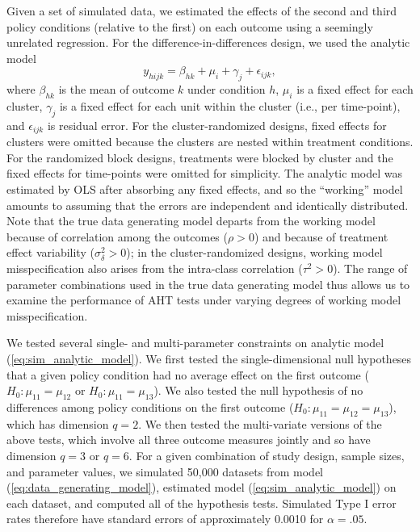 \documentclass[12pt]{article}\usepackage[]{graphicx}\usepackage[]{color}
\begin{document}
Given a set of simulated data, we estimated the effects of the second and third policy conditions (relative to the first) on each outcome using a seemingly unrelated regression. 
For the difference-in-differences design, we used the analytic model
\begin{equation}
\label{eq:sim_analytic_model}
y_{hijk} = \beta_{hk} + \mu_i + \gamma_j + \epsilon_{ijk},
\end{equation}
where $\beta_{hk}$ is the mean of outcome $k$ under condition $h$, $\mu_i$ is a fixed effect for each cluster, $\gamma_j$ is a fixed effect for each unit within the cluster (i.e., per time-point), and $\epsilon_{ijk}$ is residual error. 
For the cluster-randomized designs, fixed effects for clusters were omitted because the clusters are nested within treatment conditions. 
For the randomized block designs, treatments were blocked by cluster and the fixed effects for time-points were omitted for simplicity.
The analytic model was estimated by OLS after absorbing any fixed effects, and so the ``working'' model amounts to assuming that the errors are independent and identically distributed. 
Note that the true data generating model departs from the working model because of correlation among the outcomes ($\rho > 0$) and because of treatment effect variability ($\sigma_\delta^2 > 0$); in the cluster-randomized designs, working model misspecification also arises from the intra-class correlation ($\tau^2 > 0$). 
The range of parameter combinations used in the true data generating model thus allows us to examine the performance of AHT tests under varying degrees of working model misspecification.



We tested several single- and multi-parameter constraints on analytic model (\ref{eq:sim_analytic_model}). 
We first tested the single-dimensional null hypotheses that a given policy condition had no average effect on the first outcome ($H_0: \mu_{11} = \mu_{12}$ or $H_0: \mu_{11} = \mu_{13}$). 
We also tested the null hypothesis of no differences among policy conditions on the first outcome ($H_0: \mu_{11} = \mu_{12} = \mu_{13}$), which has dimension $q = 2$. 
We then tested the multi-variate versions of the above tests, which involve all three outcome measures jointly and so have dimension $q = 3$ or $q = 6$. 
For a given combination of study design, sample sizes, and parameter values, we simulated 50,000 datasets from model (\ref{eq:data_generating_model}), estimated model (\ref{eq:sim_analytic_model}) on each dataset, and computed all of the hypothesis tests. 
Simulated Type I error rates therefore have standard errors of approximately 0.0010 for $\alpha = .05$. 
\end{document}
